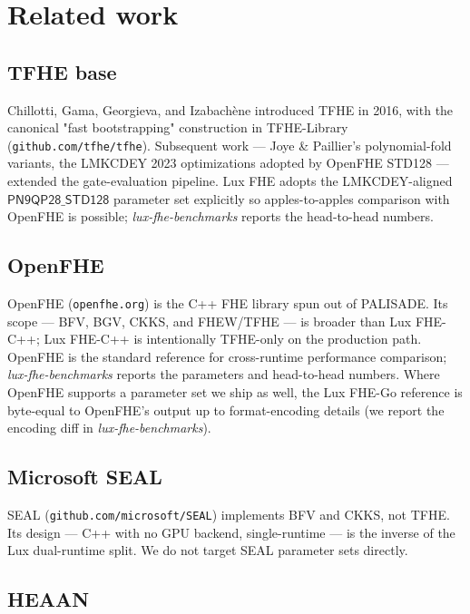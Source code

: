 \section{Related work}
\label{sec:fhe-related-work}

\subsection{TFHE base}

Chillotti, Gama, Georgieva, and Izabach\`ene introduced TFHE in 2016,
with the canonical "fast bootstrapping" construction in TFHE-Library
(\texttt{github.com/tfhe/tfhe}). Subsequent work --- Joye \&
Paillier's polynomial-fold variants, the LMKCDEY 2023 optimizations
adopted by OpenFHE STD128 --- extended the gate-evaluation pipeline.
Lux FHE adopts the LMKCDEY-aligned $\mathsf{PN9QP28\_STD128}$
parameter set explicitly so apples-to-apples comparison with OpenFHE
is possible; \emph{lux-fhe-benchmarks} reports the head-to-head
numbers.

\subsection{OpenFHE}

OpenFHE (\texttt{openfhe.org}) is the C++ FHE library spun out of
PALISADE. Its scope --- BFV, BGV, CKKS, and FHEW/TFHE --- is broader
than Lux FHE-C++; Lux FHE-C++ is intentionally TFHE-only on the
production path. OpenFHE is the standard reference for cross-runtime
performance comparison; \emph{lux-fhe-benchmarks} reports the
parameters and head-to-head numbers. Where OpenFHE supports a
parameter set we ship as well, the Lux FHE-Go reference is byte-equal
to OpenFHE's output up to format-encoding details (we report the
encoding diff in \emph{lux-fhe-benchmarks}).

\subsection{Microsoft SEAL}

SEAL (\texttt{github.com/microsoft/SEAL}) implements BFV and CKKS,
not TFHE. Its design --- C++ with no GPU backend, single-runtime ---
is the inverse of the Lux dual-runtime split. We do not target SEAL
parameter sets directly.

\subsection{HEAAN}

